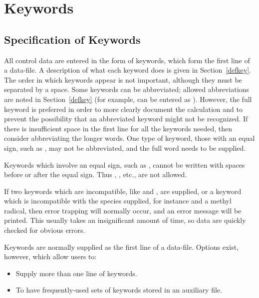 \section{Keywords}
\subsection{Specification of Keywords}
All control data are entered in the form of keywords, which form the first 
line  of  a data-file.  A description of what each keyword does is given in
Section~\ref{defkey}. The order in which keywords  appear is not important,
although they must be separated by a space.  Some keywords can be abbreviated;
allowed abbreviations are noted in Section~\ref{defkey}  (for example,
 can be entered as ).  However, the full keyword
is preferred in order to  more  clearly  document  the  calculation  and  to
prevent  the  possibility  that  an  abbreviated  keyword  might  not  be
recognized.  If there is insufficient space in the first line for all the
keywords  needed,  then consider abbreviating the longer words.  One type of
keyword, those with an equal sign, such as ,  may  not  be
abbreviated, and the full word needs to be supplied.

Keywords which involve an equal sign, such as , cannot be
written with spaces before or after the  equal  sign.   Thus  , , etc., are not allowed.  

If two keywords which are  incompatible,  like    and , 
are supplied,  or  a keyword which is incompatible with the species supplied,
for instance  and a  methyl  radical,  then  error  trapping 
will normally occur, and an error message will be printed.  This usually takes
an insignificant amount of time, so data are quickly checked for obvious
errors.

Keywords are normally supplied as the first line of a data-file.  Options
exist, however, which allow users to:
\begin{itemize}
\item Supply more than one line of keywords.
\item To have frequently-used sets of keywords stored in an auxiliary file.
\end{itemize}
